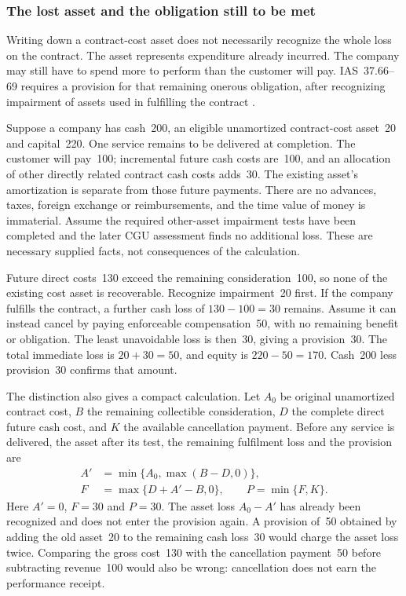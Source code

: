 \subsubsection{The lost asset and the obligation still to be met}
\label{sec:onerous-contract-sequence}

Writing down a contract-cost asset does not necessarily recognize the whole
loss on the contract. The asset represents expenditure already incurred.
The company may still have to spend more to perform than the customer will
pay. IAS~37.66--69 requires a provision for that remaining onerous obligation,
after recognizing impairment of assets used in fulfilling the contract
\citep{eu20231803}.

Suppose a company has cash~200, an eligible unamortized contract-cost asset~20
and capital~220. One service remains to be delivered at completion. The customer
will pay~100; incremental future cash costs are~100, and an allocation of other
directly related contract cash costs adds~30. The existing asset's amortization
is separate from those future payments. There are no advances, taxes, foreign
exchange or reimbursements, and the time value of money is immaterial. Assume
the required other-asset impairment tests have been completed and the later
CGU assessment finds no additional loss. These are necessary supplied facts,
not consequences of the calculation.

Future direct costs~130 exceed the remaining consideration~100, so none of the
existing cost asset is recoverable. Recognize impairment~20 first. If the
company fulfills the contract, a further cash loss of \(130-100=30\) remains.
Assume it can instead cancel by paying enforceable compensation~50, with no
remaining benefit or obligation. The least unavoidable loss is then~30, giving
a provision~30. The total immediate loss is \(20+30=50\), and equity is
\(220-50=170\). Cash~200 less provision~30 confirms that amount.

The distinction also gives a compact calculation. Let \(A_0\) be original
unamortized contract cost, \(B\) the remaining collectible consideration,
\(D\) the complete direct future cash cost, and \(K\) the available
cancellation payment. Before any service is delivered, the asset after its
test, the remaining fulfilment loss and the provision are
\begin{align}
 A'&=\min\{A_0,\max(B-D,0)\},\\
 F&=\max\{D+A'-B,0\},\qquad
 P=\min\{F,K\}.
\end{align}
Here \(A'=0\), \(F=30\) and \(P=30\). The asset loss \(A_0-A'\)
has already been recognized and does not enter the provision again. A
provision of~50 obtained by adding the old asset~20 to the remaining cash
loss~30 would charge the asset loss twice. Comparing the gross cost~130 with
the cancellation payment~50 before subtracting revenue~100 would also be
wrong: cancellation does not earn the performance receipt.


